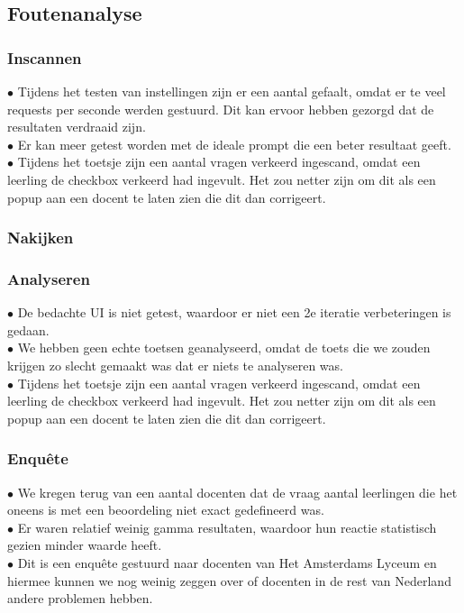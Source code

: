 \documentclass[12pt]{article}
\begin{document}
\subsection{Foutenanalyse}
\begin{multicols}{2}
\subsubsection{Inscannen}
$\bullet$ Tijdens het testen van instellingen zijn er een aantal gefaalt, omdat er te veel requests per seconde werden gestuurd. Dit kan ervoor hebben gezorgd dat de resultaten verdraaid zijn.\\
$\bullet$ Er kan meer getest worden met de ideale prompt die een beter resultaat geeft. \\
$\bullet$ Tijdens het toetsje zijn een aantal vragen verkeerd ingescand, omdat een leerling de checkbox verkeerd had ingevult. Het zou netter zijn om dit als een popup aan een docent te laten zien die dit dan corrigeert.\\

\subsubsection{Nakijken}
\subsubsection{Analyseren}
$\bullet$ De bedachte UI is niet getest, waardoor er niet een 2e iteratie verbeteringen is gedaan.\\
$\bullet$ We hebben geen echte toetsen geanalyseerd, omdat de toets die we zouden krijgen zo slecht gemaakt was dat er niets te analyseren was.\\
$\bullet$ Tijdens het toetsje zijn een aantal vragen verkeerd ingescand, omdat een leerling de checkbox verkeerd had ingevult. Het zou netter zijn om dit als een popup aan een docent te laten zien die dit dan corrigeert.\\

\subsubsection{Enquête}
$\bullet$ We kregen terug van een aantal docenten dat de vraag aantal leerlingen die het oneens is met een beoordeling niet exact gedefineerd was.\\
$\bullet$ Er waren relatief weinig gamma resultaten, waardoor hun reactie statistisch gezien minder waarde heeft.\\
$\bullet$ Dit is een enquête gestuurd naar docenten van Het Amsterdams Lyceum en hiermee kunnen we nog weinig zeggen over of docenten in de rest van Nederland andere problemen hebben.\\

\end{multicols}
\end{document}
